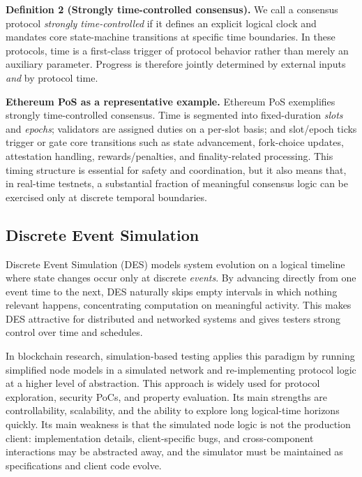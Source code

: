 \smallskip
\noindent\textbf{Definition 2 (Strongly time-controlled consensus).}
We call a consensus protocol \emph{strongly time-controlled} if it defines an explicit logical clock and mandates core state-machine transitions at specific time boundaries. In these protocols, time is a first-class trigger of protocol behavior rather than merely an auxiliary parameter. Progress is therefore jointly determined by external inputs \emph{and} by protocol time.

\smallskip
\noindent\textbf{Ethereum PoS as a representative example.}
Ethereum PoS exemplifies strongly time-controlled consensus. Time is segmented into fixed-duration \textit{slots} and \textit{epochs}; validators are assigned duties on a per-slot basis; and slot/epoch ticks trigger or gate core transitions such as state advancement, fork-choice updates, attestation handling, rewards/penalties, and finality-related processing. This timing structure is essential for safety and coordination, but it also means that, in real-time testnets, a substantial fraction of meaningful consensus logic can be exercised only at discrete temporal boundaries.

\subsection{Discrete Event Simulation}

Discrete Event Simulation (DES) models system evolution on a logical timeline where state changes occur only at discrete \emph{events}. By advancing directly from one event time to the next, DES naturally skips empty intervals in which nothing relevant happens, concentrating computation on meaningful activity. This makes DES attractive for distributed and networked systems and gives testers strong control over time and schedules.

In blockchain research, simulation-based testing applies this paradigm by running simplified node models in a simulated network and re-implementing protocol logic at a higher level of abstraction. This approach is widely used for protocol exploration, security PoCs, and property evaluation. Its main strengths are controllability, scalability, and the ability to explore long logical-time horizons quickly. Its main weakness is that the simulated node logic is not the production client: implementation details, client-specific bugs, and cross-component interactions may be abstracted away, and the simulator must be maintained as specifications and client code evolve.

